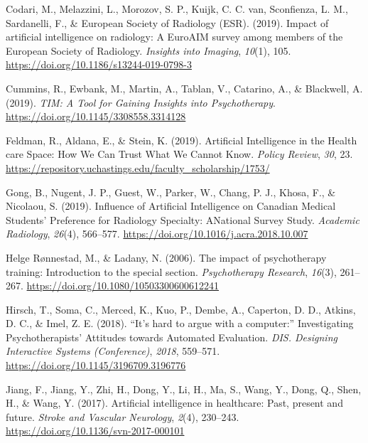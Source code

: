\documentclass[
  man]{apa7}
\newlength{\cslhangindent}
\newlength{\cslentryspacingunit} %
\newenvironment{CSLReferences}[2] %
 {%
  \setlength{\parindent}{0pt}
  \ifodd #1
  \let\oldpar\par
  \def\par{\hangindent=\cslhangindent\oldpar}
  \fi
  \setlength{\parskip}{#2\cslentryspacingunit}
 }%
 {}
\begin{document}
\begin{CSLReferences}{1}{0}
\leavevmode{}%
Codari, M., Melazzini, L., Morozov, S. P., Kuijk, C. C. van, Sconfienza, L. M., Sardanelli, F., \& European Society of Radiology (ESR). (2019). Impact of artificial intelligence on radiology: A {EuroAIM} survey among members of the {European} {Society} of {Radiology}. \emph{Insights into Imaging}, \emph{10}(1), 105. \url{https://doi.org/10.1186/s13244-019-0798-3}

\leavevmode{}%
Cummins, R., Ewbank, M., Martin, A., Tablan, V., Catarino, A., \& Blackwell, A. (2019). \emph{{TIM}: {A} {Tool} for {Gaining} {Insights} into {Psychotherapy}}. \url{https://doi.org/10.1145/3308558.3314128}

\leavevmode{}%
Feldman, R., Aldana, E., \& Stein, K. (2019). Artificial {Intelligence} in the {Health} care {Space}: {How} {We} {Can} {Trust} {What} {We} {Cannot} {Know}. \emph{Policy Review}, \emph{30}, 23. \url{https://repository.uchastings.edu/faculty_scholarship/1753/}

\leavevmode{}%
Gong, B., Nugent, J. P., Guest, W., Parker, W., Chang, P. J., Khosa, F., \& Nicolaou, S. (2019). Influence of {Artificial} {Intelligence} on {Canadian} {Medical} {Students}' {Preference} for {Radiology} {Specialty}: {ANational} {Survey} {Study}. \emph{Academic Radiology}, \emph{26}(4), 566--577. \url{https://doi.org/10.1016/j.acra.2018.10.007}

\leavevmode{}%
Helge Rønnestad, M., \& Ladany, N. (2006). The impact of psychotherapy training: {Introduction} to the special section. \emph{Psychotherapy Research}, \emph{16}(3), 261--267. \url{https://doi.org/10.1080/10503300600612241}

\leavevmode{}%
Hirsch, T., Soma, C., Merced, K., Kuo, P., Dembe, A., Caperton, D. D., Atkins, D. C., \& Imel, Z. E. (2018). {``{It}'s hard to argue with a computer:''} {Investigating} {Psychotherapists}' {Attitudes} towards {Automated} {Evaluation}. \emph{DIS. Designing Interactive Systems (Conference)}, \emph{2018}, 559--571. \url{https://doi.org/10.1145/3196709.3196776}

\leavevmode{}%
Jiang, F., Jiang, Y., Zhi, H., Dong, Y., Li, H., Ma, S., Wang, Y., Dong, Q., Shen, H., \& Wang, Y. (2017). Artificial intelligence in healthcare: Past, present and future. \emph{Stroke and Vascular Neurology}, \emph{2}(4), 230--243. \url{https://doi.org/10.1136/svn-2017-000101}


\end{CSLReferences}
\end{document}
